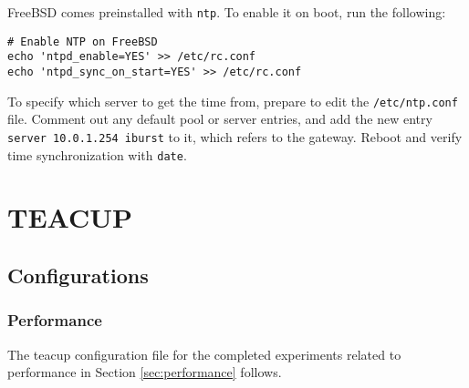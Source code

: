 FreeBSD comes preinstalled with \lstinline{ntp}. To enable it on boot, run the following:

\begin{verbatim}
# Enable NTP on FreeBSD
echo 'ntpd_enable=YES' >> /etc/rc.conf
echo 'ntpd_sync_on_start=YES' >> /etc/rc.conf
\end{verbatim}

To specify which server to get the time from, prepare to edit the \lstinline{/etc/ntp.conf} file. Comment out any default pool or server entries, and add the new entry \lstinline{server 10.0.1.254 iburst} to it, which refers to the gateway. Reboot and verify time synchronization with \lstinline{date}.



















\chapter{TEACUP}


\section{Configurations} \label{teacup_configs}

\subsection{Performance} \label{app:teacup-performance}

The \gls{teacup} configuration file for the completed experiments related to performance in Section \ref{sec:performance} follows.

